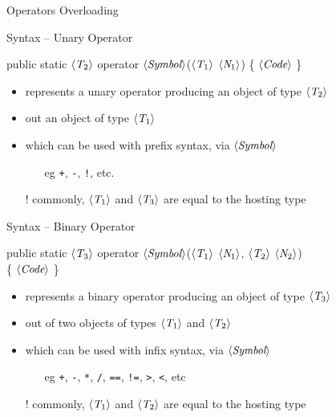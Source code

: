 \documentclass[presentation]{beamer}
\newcommand{\cscat}[1]{$\langle\text{{\itshape#1}}\rangle$}
\begin{document}
\begin{frame}[allowframebreaks]{Operators Overloading}
  \begin{block}{Syntax -- Unary Operator}
    \begin{center}\ttfamily
      public static \cscat{T$_2$} \alert{operator} \cscat{Symbol}\alert{(}\cscat{T$_1$} \cscat{N$_1$}\alert{)} \{ \cscat{Code} \}
    \end{center}
    \begin{itemize}
      \item represents a unary operator producing an object of type \texttt{\cscat{T$_2$}} 
      \item out an object of type \texttt{\cscat{T$_1$}}
      \item which can be used with prefix syntax, via \texttt{\cscat{Symbol}}
      \begin{itemize}
        \item[eg] \texttt{+}, \texttt{-}, \texttt{!}, etc.
      \end{itemize}
      \item[!] commonly, \texttt{\cscat{T$_1$}} and \texttt{\cscat{T$_3$}} are equal to the hosting type
    \end{itemize}
  \end{block}

  \begin{block}{Syntax -- Binary Operator}
    \begin{center}\ttfamily
      public static \cscat{T$_3$} \alert{operator} \cscat{Symbol}\alert{(}\cscat{T$_1$} \cscat{N$_1$}\alert{,} \cscat{T$_2$} \cscat{N$_2$}\alert{)} \\ \{ \cscat{Code} \}
    \end{center}
    \begin{itemize}
      \item represents a binary operator producing an object of type \texttt{\cscat{T$_3$}} 
      \item out of two objects of types \texttt{\cscat{T$_1$}} and \texttt{\cscat{T$_2$}}
      \item which can be used with infix syntax, via \texttt{\cscat{Symbol}}
      \begin{itemize}
        \item[eg] \texttt{+}, \texttt{-}, \texttt{*}, \texttt{/}, \texttt{==}, \texttt{!=}, \texttt{>}, \texttt{<}, etc
      \end{itemize}
      \item[!] commonly, \texttt{\cscat{T$_1$}} and \texttt{\cscat{T$_2$}} are equal to the hosting type
    \end{itemize}
  \end{block}


\end{frame}
\end{document}
